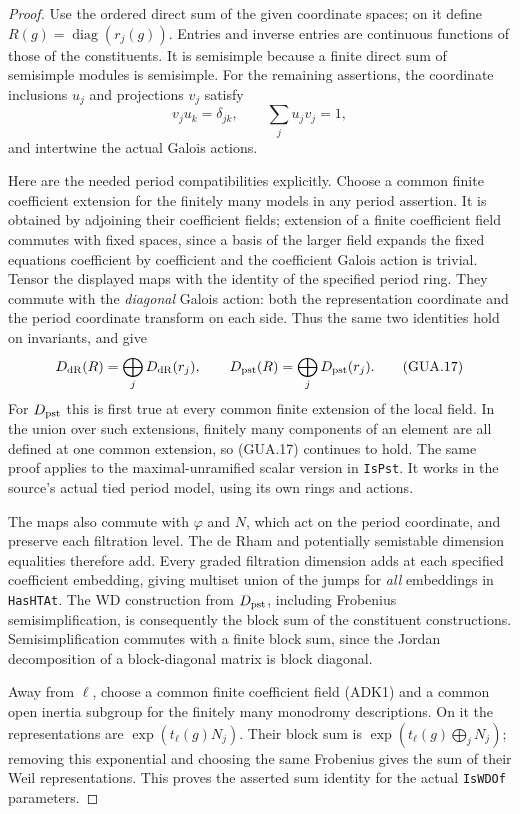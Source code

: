\documentclass[11pt,a4paper]{article}
\numberwithin{equation}{section}
\theoremstyle{remark}\newtheorem{remark}[theorem]{Remark}
\begin{document}
\begin{proof}
Use the ordered direct sum of the given coordinate spaces;
on it define $R(g)=\operatorname{diag}(r_j(g))$.
Entries and inverse entries are continuous functions of
those of the constituents.  It is semisimple because a
finite direct sum of semisimple modules is semisimple.
For the remaining assertions, the coordinate inclusions
$u_j$ and projections $v_j$ satisfy
\[
 v_j u_k=\delta_{jk},\qquad \sum_j u_jv_j=1,
\]
and intertwine the actual Galois actions.

Here are the needed period compatibilities explicitly.
Choose a common finite coefficient extension for the
finitely many models in any period assertion.  It is
obtained by adjoining their coefficient fields; extension
of a finite coefficient field commutes with fixed spaces,
since a basis of the larger field expands the fixed
equations coefficient by coefficient and the coefficient
Galois action is trivial.  Tensor the displayed maps with
the identity of the specified period ring.  They commute
with the \emph{diagonal} Galois action: both the
representation coordinate and the period coordinate
transform on each side.  Thus the same two identities
hold on invariants, and give
\[
 D_{\rm dR}(R)=\bigoplus_jD_{\rm dR}(r_j),\qquad
 D_{\rm pst}(R)=\bigoplus_jD_{\rm pst}(r_j).        \tag{GUA.17}
\]
For $D_{\rm pst}$ this is first true at every common
finite extension of the local field.  In the union over
such extensions, finitely many components of an element
are all defined at one common extension, so (GUA.17)
continues to hold.  The same proof applies to the
maximal-unramified scalar version in \texttt{Is\allowbreak Pst}.
It works in the source's actual tied period model,
using its own rings and actions.

The maps also commute with $\varphi$ and $N$, which
act on the period coordinate, and preserve each
filtration level.  The de Rham and potentially
semistable dimension equalities therefore add.
Every graded filtration dimension adds at each
specified coefficient embedding, giving multiset union
of the jumps for \emph{all} embeddings in
\texttt{Has\allowbreak HTAt}.  The WD construction from
$D_{\rm pst}$, including Frobenius semisimplification,
is consequently the block sum of the constituent
constructions.  Semisimplification commutes with a
finite block sum, since the Jordan decomposition of a
block-diagonal matrix is block diagonal.

Away from $\ell$, choose a common finite coefficient
field (ADK1) and a common open inertia subgroup for
the finitely many monodromy descriptions.  On it the
representations are $\exp(t_\ell(g)N_j)$.
Their block sum is $\exp(t_\ell(g)\bigoplus_jN_j)$;
removing this exponential and choosing the same
Frobenius gives the sum of their Weil representations.
This proves the asserted sum identity for the actual
\texttt{Is\allowbreak WDOf} parameters.


\end{proof}
\end{document}

